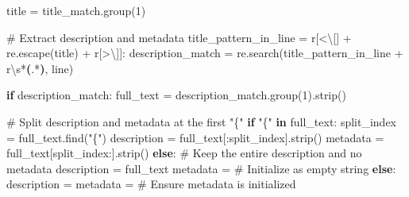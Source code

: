 \documentclass[
  11pt,
  letterpaper,
  openany]{book}
\newenvironment{Shaded}{\begin{snugshade}}{\end{snugshade}}
\newcommand{\CharTok}[1]{\textcolor[rgb]{0.13,0.47,0.30}{#1}}
\newcommand{\CommentTok}[1]{\textcolor[rgb]{0.37,0.37,0.37}{#1}}
\newcommand{\ControlFlowTok}[1]{\textcolor[rgb]{0.00,0.23,0.31}{\textbf{#1}}}
\newcommand{\DecValTok}[1]{\textcolor[rgb]{0.68,0.00,0.00}{#1}}
\newcommand{\KeywordTok}[1]{\textcolor[rgb]{0.00,0.23,0.31}{\textbf{#1}}}
\newcommand{\NormalTok}[1]{\textcolor[rgb]{0.00,0.23,0.31}{#1}}
\newcommand{\OperatorTok}[1]{\textcolor[rgb]{0.37,0.37,0.37}{#1}}
\newcommand{\PreprocessorTok}[1]{\textcolor[rgb]{0.68,0.00,0.00}{#1}}
\newcommand{\StringTok}[1]{\textcolor[rgb]{0.13,0.47,0.30}{#1}}
\newcommand{\VerbatimStringTok}[1]{\textcolor[rgb]{0.13,0.47,0.30}{#1}}
\begin{document}
\begin{landscape}
\begin{Shaded}
\begin{Highlighting}[]
\NormalTok{        title }\OperatorTok{=}\NormalTok{ title\_match.group(}\DecValTok{1}\NormalTok{)}

        \CommentTok{\# Extract description and metadata}
\NormalTok{        title\_pattern\_in\_line }\OperatorTok{=} \VerbatimStringTok{r\textquotesingle{}}\PreprocessorTok{[\textless{}}\CharTok{\textbackslash{}[}\PreprocessorTok{]}\VerbatimStringTok{\textquotesingle{}} \OperatorTok{+}\NormalTok{ re.escape(title) }\OperatorTok{+} \VerbatimStringTok{r\textquotesingle{}}\PreprocessorTok{[\textgreater{}}\CharTok{\textbackslash{}]}\PreprocessorTok{]}\VerbatimStringTok{:\textquotesingle{}}
\NormalTok{        description\_match }\OperatorTok{=}\NormalTok{ re.search(title\_pattern\_in\_line }\OperatorTok{+} \VerbatimStringTok{r\textquotesingle{}}\DecValTok{\textbackslash{}s}\OperatorTok{*}\KeywordTok{(}\DecValTok{.}\OperatorTok{*}\KeywordTok{)}\VerbatimStringTok{\textquotesingle{}}\NormalTok{, line)}

        \ControlFlowTok{if}\NormalTok{ description\_match:}
\NormalTok{            full\_text }\OperatorTok{=}\NormalTok{ description\_match.group(}\DecValTok{1}\NormalTok{).strip()}

            \CommentTok{\# Split description and metadata at the first "\{"}
            \ControlFlowTok{if} \StringTok{"\{"} \KeywordTok{in}\NormalTok{ full\_text:}
\NormalTok{                split\_index }\OperatorTok{=}\NormalTok{ full\_text.find(}\StringTok{"\{"}\NormalTok{)}
\NormalTok{                description }\OperatorTok{=}\NormalTok{ full\_text[:split\_index].strip()}
\NormalTok{                metadata }\OperatorTok{=}\NormalTok{ full\_text[split\_index:].strip()}
            \ControlFlowTok{else}\NormalTok{:}
                \CommentTok{\# Keep the entire description and no metadata}
\NormalTok{                description }\OperatorTok{=}\NormalTok{ full\_text}
\NormalTok{                metadata }\OperatorTok{=} \StringTok{\textquotesingle{}\textquotesingle{}}  \CommentTok{\# Initialize as empty string}
        \ControlFlowTok{else}\NormalTok{:}
\NormalTok{            description }\OperatorTok{=} \StringTok{\textquotesingle{}\textquotesingle{}}
\NormalTok{            metadata }\OperatorTok{=} \StringTok{\textquotesingle{}\textquotesingle{}}  \CommentTok{\# Ensure metadata is initialized}


\end{Highlighting}
\end{Shaded}
\end{landscape}
\end{document}
